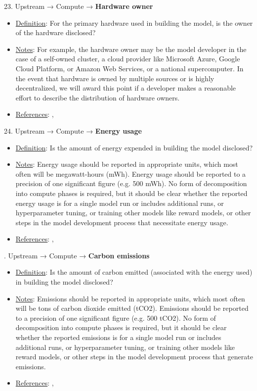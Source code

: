 23. Upstream → Compute → \textbf{Hardware owner}
\vspace{-\parskip}
\begin{itemize}
\item
\underline{Definition}: For the primary hardware used in building the model, is the owner of the hardware disclosed?
\item
\underline{Notes}: For example, the hardware owner may be the model developer in the case of a self-owned cluster, a cloud provider like Microsoft Azure, Google Cloud Platform, or Amazon Web Services, or a national supercomputer. In the event that hardware is owned by multiple sources or is highly decentralized, we will award this point if a developer makes a reasonable effort to describe the distribution of hardware owners.
\item
\underline{References}: \citet{sevilla2022compute}, \citet{hoffmann2022training}
\end{itemize}


24. Upstream → Compute → \textbf{Energy usage}
\vspace{-\parskip}
\begin{itemize}
\item
\underline{Definition}: Is the amount of energy expended in building the model disclosed?
\item
\underline{Notes}: Energy usage should be reported in appropriate units, which most often will be megawatt-hours (mWh). Energy usage should be reported to a precision of one significant figure (e.g. 500 mWh). No form of decomposition into compute phases is required, but it should be clear whether the reported energy usage is for a single model run or includes additional runs, or hyperparameter tuning, or training other models like reward models, or other steps in the model development process that necessitate energy usage.
\item
\underline{References}: \citet{lacoste2019quantifying}, \citet{patterson2021carbon}
\end{itemize}


. Upstream → Compute → \textbf{Carbon emissions}
\vspace{-\parskip}
\begin{itemize}
\item
\underline{Definition}: Is the amount of carbon emitted (associated with the energy used) in building the model disclosed?
\item
\underline{Notes}: Emissions should be reported in appropriate units, which most often will be tons of carbon dioxide emitted (tCO2). Emissions should be reported to a precision of one significant figure (e.g. 500 tCO2). No form of decomposition into compute phases is required, but it should be clear whether the reported emissions is for a single model run or includes additional runs, or hyperparameter tuning, or training other models like reward models, or other steps in the model development process that generate emissions.
\item
\underline{References}: \citet{lacoste2019quantifying}, \citet{patterson2021carbon}
\end{itemize}


